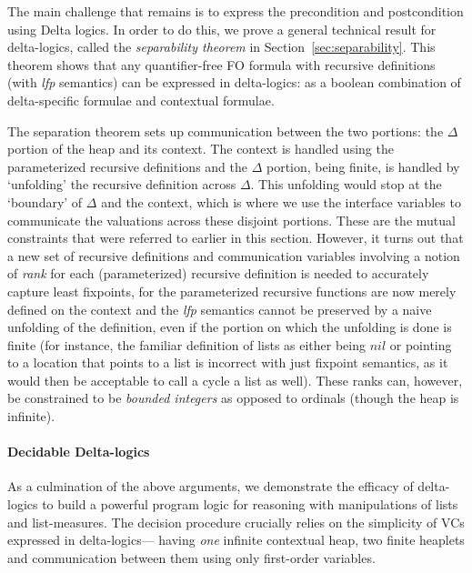 The main challenge that remains is to express the precondition and postcondition using Delta logics.
In order to do this, we prove a general technical result for delta-logics, called the \emph{separability theorem} in Section~\ref{sec:separability}. This theorem shows that any quantifier-free FO formula
with recursive definitions (with \textit{lfp} semantics) can be expressed in delta-logics: as a boolean combination of delta-specific formulae
and contextual formulae. 

The separation theorem sets up communication between the two portions: the $\Delta$ portion of the heap 
and its context. The context is handled using the parameterized recursive definitions and the $\Delta{}$ portion, being finite, is handled by `unfolding' the recursive definition across $\Delta{}$. This unfolding would stop at the `boundary' of $\Delta{}$ and the context, which is where we use the interface variables to communicate the valuations across these disjoint portions. These are the mutual constraints that were referred to earlier in this section.
However, it turns out that a new set of recursive definitions and communication variables involving a notion of \emph{rank} for each (parameterized) recursive definition is
needed to accurately capture least fixpoints, for the parameterized recursive functions are now merely defined on the context and the \textit{lfp} semantics cannot be preserved by a naive unfolding of the definition, even if the portion on which the unfolding is done is finite (for instance, the familiar definition of lists as either being $nil$ or pointing to a location that points to a list is incorrect with just fixpoint semantics, as it would then be acceptable to call a cycle a list as well). These ranks can, however, be constrained to be \emph{bounded integers} as opposed to ordinals (though the heap is infinite). 


\paragraph{Decidable Delta-logics}
  As a culmination of the above arguments, we demonstrate the efficacy of delta-logics to build a powerful program logic for reasoning with manipulations of lists and list-measures. The decision procedure crucially relies on the simplicity of VCs expressed in delta-logics--- having \emph{one} infinite contextual heap, two finite heaplets and communication between them using only first-order variables.


